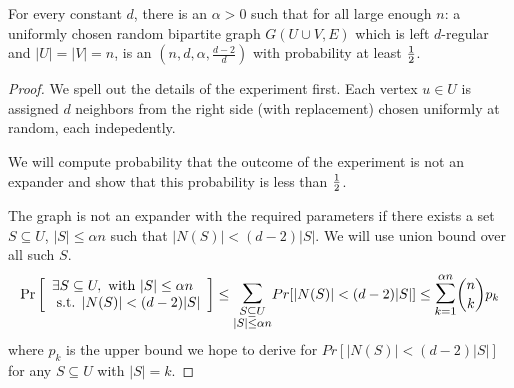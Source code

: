 \begin{theorem}
For every constant $d$, there is an $\alpha > 0$ such that for all large enough $n$: a uniformly chosen random bipartite graph $G(U \cup V, E)$ which is left $d$-regular and $|U|=|V|=n$, is an $(n,d,\alpha,\frac{d-2}{d})$ with probability at least $\frac{1}{2}$.
\end{theorem}
\begin{proof}
We spell out the details of the experiment first. Each vertex $u \in U$ is assigned $d$ neighbors from the right side (with replacement) chosen uniformly at random, each indepedently. 

We will compute probability that the outcome of the experiment is not an expander and show that this probability is less than $\frac{1}{2}$.

\noindent The graph is not an expander with the required parameters if there exists a set $S \subseteq U$, $|S|\le \alpha n$ such that $|N(S)| < (d-2)|S|$. We will use union bound over all such $S$.
$$
\Pr\left[\begin{array}{l}
\exists S \subseteq U, \textrm{ with } |S|\le \alpha n \\
\textrm{ s.t. } |N(S)| < (d-2)|S|
\end{array}
\right] 
\le \bigsum_{\substack{S \subseteq U\\
|S|\le \alpha n}} Pr[|N(S)| < (d-2)|S|] 
\le \bigsum_{k=1}^{\alpha n} {n \choose k} p_k
$$
where $p_k$ is the upper bound we hope to derive for $Pr[|N(S)| < (d-2)|S|]$ for any $S \subseteq U$ with $|S|=k$.


\end{proof}
